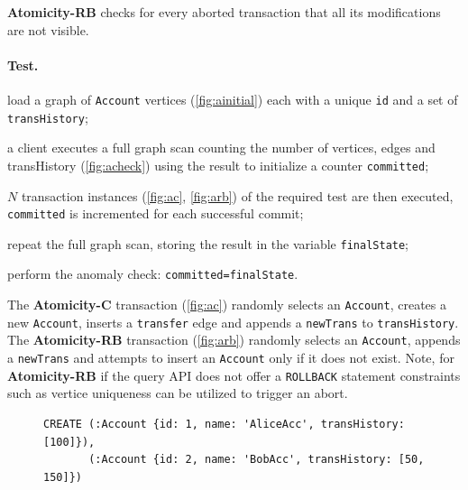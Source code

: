   {\flushleft \textbf{Atomicity-RB}} checks for every aborted transaction that all
its modifications are not visible.

\paragraph{Test.}
\begin{enumerate*}[label={(\roman*)}]
  \item load a graph of \texttt{Account} vertices (\autoref{fig:ainitial}) each
  with a unique \texttt{id} and a set of \texttt{transHistory};
  \item a client executes a full graph scan counting the number of vertices, edges
  and transHistory (\autoref{fig:acheck}) using the result to initialize a
  counter \texttt{committed};
  \item $N$ transaction instances (\autoref{fig:ac}, \autoref{fig:arb}) of the
  required test are then executed, \texttt{committed} is incremented for
  each successful commit;
  \item repeat the full graph scan, storing the result in the variable
  \texttt{finalState};
  \item perform the anomaly check: \texttt{committed=finalState}.
\end{enumerate*}

The \textbf{Atomicity-C} transaction (\autoref{fig:ac}) randomly selects an
\texttt{Account}, creates a new \texttt{Account}, inserts a \texttt{transfer}
edge and appends a \texttt{newTrans} to \texttt{transHistory}. The \textbf{Atomicity-RB}
transaction (\autoref{fig:arb}) randomly selects an \texttt{Account}, appends a
\texttt{newTrans} and attempts to insert an \texttt{Account} only if it does
not exist. Note, for \textbf{Atomicity-RB} if the query API does not offer a
\texttt{ROLLBACK} statement constraints such as vertice uniqueness can be utilized
to trigger an abort.

\begin{figure}[htb]
  \centering

  \begin{lstlisting}[language=cypher,label=fig:ainitial,caption=Cypher query for creating initial data for the \tx{Atomicity} transactions.]
CREATE (:Account {id: 1, name: 'AliceAcc', transHistory: [100]}),
       (:Account {id: 2, name: 'BobAcc', transHistory: [50, 150]})
\end{lstlisting}

\end{figure}

